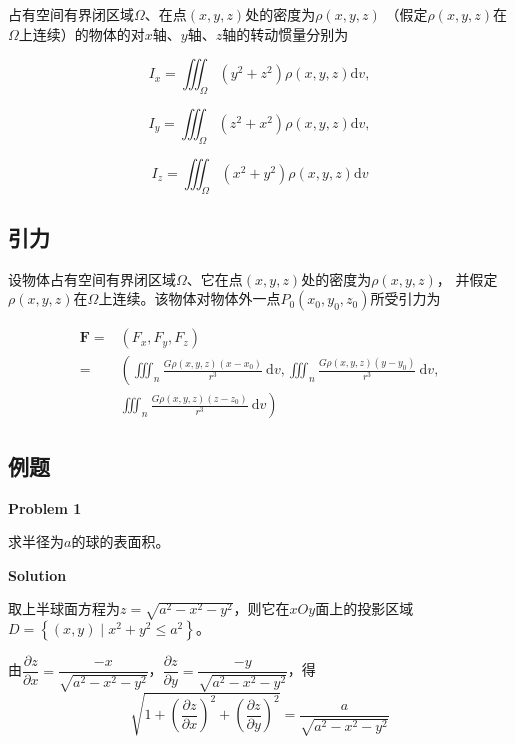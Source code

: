 \documentclass[12pt, a4paper]{article}
\numberwithin{equation}{section}
\begin{document}
    占有空间有界闭区域\(\varOmega\)、在点\(\left(x,y,z\right)\)处的密度为\(\rho\left(x,y,z\right)\)
    （假定\(\rho\left(x,y,z\right)\)在\(\varOmega\)上连续）的物体的对\(x\)轴、\(y\)轴、\(z\)轴的转动惯量分别为

    $$
        I_x=\iiint_{\Omega}\left(y^2+z^2\right) \rho(x, y, z) \mathrm{d} v,
    $$

    $$
        I_y=\iiint_{\Omega}\left(z^2+x^2\right) \rho(x, y, z) \mathrm{d} v,
    $$

    $$
        I_z=\iiint_{\Omega}\left(x^2+y^2\right) \rho(x, y, z) \mathrm{d} v
    $$

\subsection{引力}

    设物体占有空间有界闭区域\(\varOmega\)、它在点\(\left(x,y,z\right)\)处的密度为\(\rho\left(x,y,z\right)\)，
    并假定\(\rho\left(x,y,z\right)\)在\(\varOmega\)上连续。该物体对物体外一点\(P_0\left(x_0,y_0,z_0\right)\)所受引力为
    
    $$
        \begin{aligned}
            \boldsymbol{F} = & \left(F_x, F_y, F_z\right) \\
            = &\left(\iiint_n \frac{G \rho(x, y, z)\left(x-x_0\right)}{r^3} \mathrm{~d} v, \iiint_n \frac{G \rho(x, y, z)\left(y-y_0\right)}{r^3} \mathrm{~d} v,\right. \\
            & \left.\iiint_n \frac{G \rho(x, y, z)\left(z-z_0\right)}{r^3} \mathrm{~d} v\right)
        \end{aligned}
    $$

\subsection{例题}

    \textbf{Problem 1}
    \vspace{1em}

    求半径为$a$的球的表面积。
    \vspace{1em}

    \textbf{Solution}
    \vspace{1em}

    取上半球面方程为\(z = \sqrt{a^2 - x^2 - y^2}\)，则它在\(xOy\)面上的投影区域\\
    \(D = \left\{(x,y) \mid x^2 + y^2 \leq a^2\right\}\)。

    由$\dfrac{\partial z}{\partial x}=\dfrac{-x}{\sqrt{a^2-x^2-y^2}}$，$\dfrac{\partial z}{\partial y}=\dfrac{-y}{\sqrt{a^2-x^2-y^2}}$，得
    $$\sqrt{1+\left(\frac{\partial z}{\partial x}\right)^2+\left(\frac{\partial z}{\partial y}\right)^2}=\frac{a}{\sqrt{a^2-x^2-y^2}}$$
    
\end{document}

